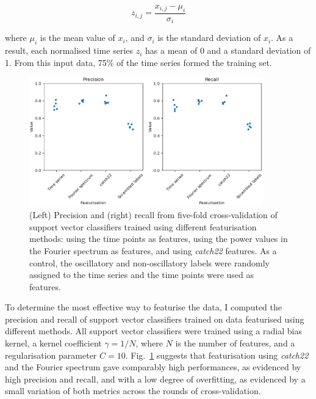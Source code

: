 \begin{equation}
  z_{i,j} = \frac{x_{i,j} - \mu_{i}}{\sigma_{i}}
  \label{eq:analysis-stdscore}
\end{equation}

where $\mu_{i}$ is the mean value of $x_{i}$, and $\sigma_{i}$ is the standard deviation of $x_{i}$.
As a result, each normalised time series $z_{i}$ has a mean of 0 and a standard deviation of 1.
From this input data, 75\% of the time series formed the training set.

\begin{figure}
  \centering
  \includegraphics[width=0.9\textwidth]{svm_feat_compare_edit.pdf}
  \caption[
  ]{
    (Left) Precision and (right) recall from five-fold cross-validation of support vector classifiers trained using different featurisation methods:
    using the time points as features,
    using the power values in the Fourier spectrum as features,
    and using \emph{catch22} features.
    As a control, the oscillatory and non-oscillatory labels were randomly assigned to the time series and the time points were used as features.
  }
  \label{fig:analysis-precision-recall}
\end{figure}


To determine the most effective way to featurise the data, I computed the precision and recall of support vector classifiers trained on data featurised using different methods.
All support vector classifiers were trained using a radial bias kernel, a kernel coefficient $\gamma = 1/N$, where $N$ is the number of features, and a regularisation parameter $C = 10$.
Fig.\ \ref{fig:analysis-precision-recall} suggests that featurisation using \textit{catch22} and the Fourier spectrum gave comparably high performances, as evidenced by high precision and recall, and with a low degree of overfitting, as evidenced by a small variation of both metrics across the rounds of cross-validation.


